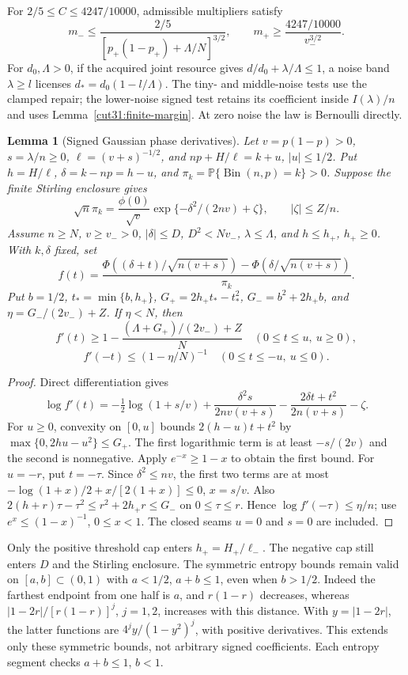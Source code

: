 \documentclass[11pt,a4paper]{article}
\numberwithin{equation}{section}
\newtheorem{lemma}[theorem]{Lemma}
\theoremstyle{definition}
\theoremstyle{remark}
\newcommand{\Pp}{\mathbb P}
\begin{document}
For \(2/5\le C\le4247/10000\), admissible multipliers satisfy
\[
 m_-\le\frac{2/5}{[p_+(1-p_+)+\Lambda/N]^{3/2}},\qquad
 m_+\ge\frac{4247/10000}{v_-^{3/2}}.
\]
For \(d_0,\Lambda>0\), if the acquired joint resource gives
\(d/d_0+\lambda/\Lambda\le1\), a noise band \(\lambda\ge l\)
licenses \(d_*=d_0(1-l/\Lambda)\).
The tiny- and middle-noise tests use the clamped repair; the
lower-noise signed test retains its coefficient inside
\(I(\lambda)/n\) and uses Lemma~\ref{cut31:finite-margin}.
At zero noise the law is Bernoulli directly.

\begin{lemma}[Signed Gaussian phase derivatives]\label{cut31:signed-gaussian-derivative}
Let \(v=p(1-p)>0\), \(s=\lambda/n\ge0\),
\(\ell=(v+s)^{-1/2}\), and \(np+H/\ell=k+u\), \(|u|\le1/2\).
Put \(h=H/\ell\), \(\delta=k-np=h-u\), and
\(\pi_k=\Pp\{\operatorname{Bin}(n,p)=k\}>0\).
Suppose the finite Stirling enclosure gives
\[
 \sqrt n\pi_k=\frac{\phi(0)}{\sqrt v}
 \exp\{-\delta^2/(2nv)+\zeta\},\qquad |\zeta|\le Z/n.
\]
Assume \(n\ge N\), \(v\ge v_->0\), \(|\delta|\le D\),
\(D^2<Nv_-\), \(\lambda\le\Lambda\), and
\(h\le h_+\), \(h_+\ge0\). With \(k,\delta\) fixed, set
\[
 f(t)=\frac{\Phi((\delta+t)/\sqrt{n(v+s)})
              -\Phi(\delta/\sqrt{n(v+s)})}{\pi_k}.
\]
Put \(b=1/2\), \(t_* =\min\{b,h_+\}\),
\(G_+=2h_+t_*-t_*^2\), \(G_-=b^2+2h_+b\), and
\(\eta=G_-/(2v_-)+Z\). If \(\eta<N\), then
\[
 f'(t)\ge1-\frac{(\Lambda+G_+)/(2v_-)+Z}{N}
 \quad(0\le t\le u,\ u\ge0),
\]
\[
 f'(-t)\le(1-\eta/N)^{-1}
 \quad(0\le t\le-u,\ u\le0).
\]
\end{lemma}
\begin{proof}
Direct differentiation gives
\[
 \log f'(t)=-\tfrac12\log(1+s/v)
 +\frac{\delta^2s}{2nv(v+s)}
 -\frac{2\delta t+t^2}{2n(v+s)}-\zeta.
\]
For \(u\ge0\), convexity on \([0,u]\) bounds
\(2(h-u)t+t^2\) by \(\max\{0,2hu-u^2\}\le G_+\).
The first logarithmic term is at least \(-s/(2v)\) and the
second is nonnegative. Apply \(e^{-x}\ge1-x\) to obtain the
first bound. For \(u=-r\), put \(t=-\tau\).
Since \(\delta^2\le nv\), the first two terms are at most
\(-\log(1+x)/2+x/[2(1+x)]\le0\), \(x=s/v\).
Also \(2(h+r)\tau-\tau^2\le r^2+2h_+r\le G_-\)
on \(0\le\tau\le r\). Hence \(\log f'(-\tau)\le\eta/n\);
use \(e^x\le(1-x)^{-1}\), \(0\le x<1\).
The closed seams \(u=0\) and \(s=0\) are included.
\end{proof}

Only the positive threshold cap enters \(h_+=H_+/\ell_-\).
The negative cap still enters \(D\) and the Stirling enclosure.
The symmetric entropy bounds remain valid on \([a,b]\subset(0,1)\)
with \(a<1/2\), \(a+b\le1\), even when \(b>1/2\).
Indeed the farthest endpoint from one half is \(a\), and
\(r(1-r)\) decreases, whereas
\(|1-2r|/[r(1-r)]^j\), \(j=1,2\), increases with this distance.
With \(y=|1-2r|\), the latter functions are
\(4^jy/(1-y^2)^j\), with positive derivatives.
This extends only these symmetric bounds, not arbitrary signed
coefficients. Each entropy segment checks \(a+b\le1\), \(b<1\).
\end{document}
